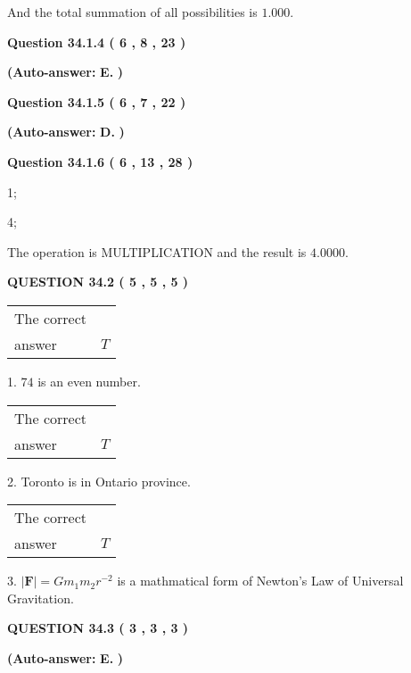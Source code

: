 \documentclass[12pt]{article}
\begin{document}
\noindent
 And the total summation of all possibilities is $  %
1.000 $.
 
  
  
{\textbf{\large{Question
34.1.4 
 (           6 ,           8 ,          23 )
}}}
 
 
{\textbf{(Auto-answer:}}
{\textbf{\large{
E.}}}
{\textbf{)}}
 
 
  
  
{\textbf{\large{Question
34.1.5 
 (           6 ,           7 ,          22 )
}}}
 
 
{\textbf{(Auto-answer:}}
{\textbf{\large{
D.}}}
{\textbf{)}}
 
 
  
  
{\textbf{\large{Question
34.1.6 
 (           6 ,          13 ,          28 )
}}}

1;
 
4;
 
The operation is  %
MULTIPLICATION and the result is
$ %
4.0000$.
 
  
  
{\textbf{\large{QUESTION
34.2 
 (           5 ,           5 ,           5 )
}}}

 
\noindent\begin{tabular}{|l|l|}\hline The correct & \\
          answer &  %
$T$ \\ \hline \end{tabular}
1. $ %
74$ is an  %
even number.
 
\noindent\begin{tabular}{|l|l|}\hline The correct & \\
          answer &  %
$T$ \\ \hline \end{tabular}
2.  %
Toronto is in  %
Ontario province.
 
\noindent\begin{tabular}{|l|l|}\hline The correct & \\
          answer &  %
$T$ \\ \hline \end{tabular}
3.  %
$\left| \mathbf{F}\right| =Gm_1m_2r^{-2}$ is a mathmatical form of  %
Newton's Law of Universal Gravitation.
 
  
  
{\textbf{\large{QUESTION
34.3 
 (           3 ,           3 ,           3 )
}}}
 
 
{\textbf{(Auto-answer:}}
{\textbf{\large{
E.}}}
{\textbf{)}}
 
\end{document}
